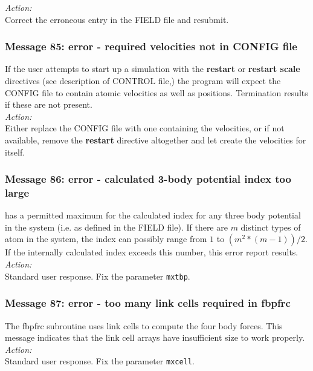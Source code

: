 \noindent
{\em Action:} \\ 
Correct the erroneous entry in the FIELD file and resubmit.

\subsubsection*{Message 85: error - required velocities not in CONFIG file}

If the user attempts to start up a \D{} simulation with the {\bf restart} or {\bf
restart scale} directives (see description of CONTROL file,) the
program will expect the CONFIG file to contain atomic velocities as
well as positions. Termination results if these are not present. \\

\noindent
{\em Action:} \\ 
Either replace the CONFIG file with one containing the velocities, or
if not available, remove the {\bf restart} directive altogether 
and let \D{} create the velocities for itself.

\subsubsection*{Message 86: error - calculated
3-body  potential index
too large}

\D{} has a permitted maximum for the calculated index for any
three body  potential in the system (i.e. as defined in the FIELD
file). If there are $m$ distinct types of atom in the system, the
index can possibly range from $1$ to $(m^{2}*(m-1))/2$. If the
internally calculated index exceeds this number, this error report
results. \\

\noindent
{\em Action:} \\
Standard user response. Fix the parameter {\tt mxtbp}.

\subsubsection*{Message 87: error - too many link cells required in fbpfrc}

The {\sc fbpfrc} subroutine uses link cells to compute the four body
forces. This message indicates that the link cell arrays have
insufficient size to work properly.\\

\noindent
{\em Action:}\\
Standard user response. Fix the parameter {\tt mxcell}.

